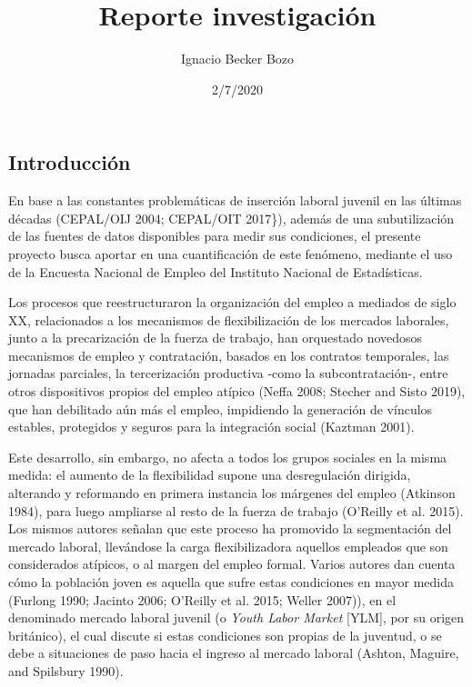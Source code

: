 \documentclass[]{article}
\title{Reporte investigación}
\author{Ignacio Becker Bozo}
\date{2/7/2020}
\begin{document}
\maketitle

\hypertarget{introducciuxf3n}{%
\subsection{Introducción}\label{introducciuxf3n}}

En base a las constantes problemáticas de inserción laboral juvenil en
las últimas décadas (CEPAL/OIJ 2004; CEPAL/OIT 2017\}), además de una
subutilización de las fuentes de datos disponibles para medir sus
condiciones, el presente proyecto busca aportar en una cuantificación de
este fenómeno, mediante el uso de la Encuesta Nacional de Empleo del
Instituto Nacional de Estadísticas.

Los procesos que reestructuraron la organización del empleo a mediados
de siglo XX, relacionados a los mecanismos de flexibilización de los
mercados laborales, junto a la precarización de la fuerza de trabajo,
han orquestado novedosos mecanismos de empleo y contratación, basados en
los contratos temporales, las jornadas parciales, la tercerización
productiva -como la subcontratación-, entre otros dispositivos propios
del empleo atípico (Neffa 2008; Stecher and Sisto 2019), que han
debilitado aún más el empleo, impidiendo la generación de vínculos
estables, protegidos y seguros para la integración social (Kaztman
2001).

Este desarrollo, sin embargo, no afecta a todos los grupos sociales en
la misma medida: el aumento de la flexibilidad supone una desregulación
dirigida, alterando y reformando en primera instancia los márgenes del
empleo (Atkinson 1984), para luego ampliarse al resto de la fuerza de
trabajo (O'Reilly et al. 2015). Los mismos autores señalan que este
proceso ha promovido la segmentación del mercado laboral, llevándose la
carga flexibilizadora aquellos empleados que son considerados atípicos,
o al margen del empleo formal. Varios autores dan cuenta cómo la
población joven es aquella que sufre estas condiciones en mayor medida
(Furlong 1990; Jacinto 2006; O'Reilly et al. 2015; Weller 2007)), en el
denominado mercado laboral juvenil (o \emph{Youth Labor Market}
{[}YLM{]}, por su origen británico), el cual discute si estas
condiciones son propias de la juventud, o se debe a situaciones de paso
hacia el ingreso al mercado laboral (Ashton, Maguire, and Spilsbury
1990).
\end{document}
